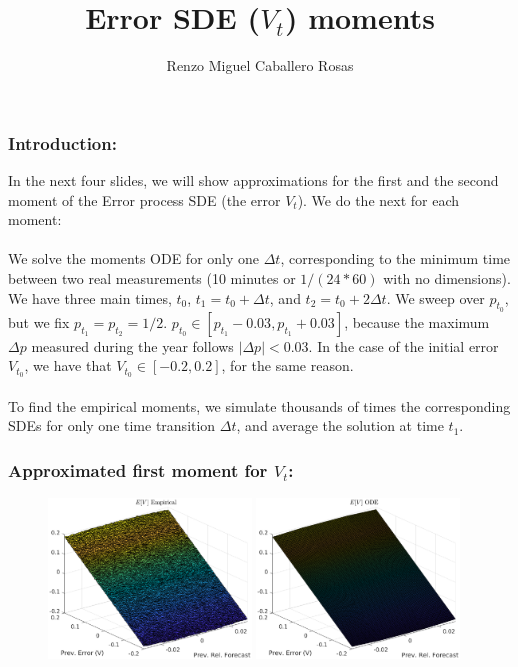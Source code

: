 \documentclass[aspectratio=169]{beamer}\usepackage[utf8]{inputenc}
\title{Error SDE ($V_t$) moments}
\subtitle{Renzo Miguel Caballero Rosas}
\begin{document}
\begin{frame}
\titlepage
\end{frame}


\begin{frame}\frametitle{Introduction:} \label{S1}

In the next four slides, we will show approximations for the first and the second moment of the Error process SDE (the error $V_t$). We do the next for each moment:\\
\quad\\
We solve the moments ODE for only one $\Delta t$, corresponding to the minimum time between two real measurements (10 minutes or $1/(24*60)$ with no dimensions). We have three main times, $t_0$, $t_1=t_0+\Delta t$, and $t_2=t_0+2\Delta t$. We sweep over $p_{t_0}$, but we fix $p_{t_1}=p_{t_2}=1/2$. $p_{t_0}\in[p_{t_1}-0.03,p_{t_1}+0.03]$, because the maximum $\Delta p$ measured during the year follows $|\Delta p|<0.03$. In the case of the initial error $V_{t_0}$, we have that $V_{t_0}\in[-0.2,0.2]$, for the same reason.\\
\quad\\
To find the empirical moments, we simulate thousands of times the corresponding SDEs for only one time transition $\Delta t$, and average the solution at time $t_1$.

\end{frame}


\begin{frame}\frametitle{Approximated first moment for $V_t$:}

\begin{figure}[ht!]
\centering
\includegraphics[width=0.48\textwidth]{../../MATLAB_Files/Results/moments/classic/1.eps}\quad
\includegraphics[width=0.48\textwidth]{../../MATLAB_Files/Results/moments/classic/2.eps}
\end{figure}

\end{frame}
\end{document}
